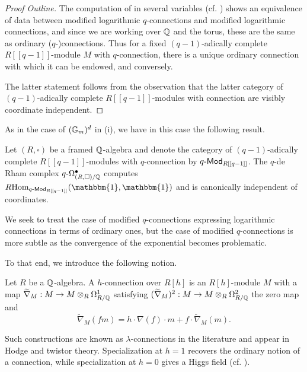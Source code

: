\begin{proof}[Proof Outline]
    The computation of  in several variables (cf. \cite[Lem. 4.1]{qDeformations}) shows an equivalence of data between modified logarithmic $q$-connections and modified logarithmic connections, and since we are working over $\mathbb{Q}$ and the torus, these are the same as ordinary ($q$-)connections. Thus for a fixed $(q-1)$-adically complete $R[[q-1]]$-module $M$ with $q$-connection, there is a unique ordinary connection with which it can be endowed, and conversely.
    
    The latter statement follows from the observation that the latter category of $(q-1)$-adically complete $R[[q-1]]$-modules with connection are visibly coordinate independent. 
\end{proof}
As in the case of $(\mathbb{G}_{m})^{d}$ in  (i), we have in this case the following result. 
\begin{corollary}\label{corr: modules with q-connection are coordinate independent}
    Let $(R,\square)$ be a framed $\mathbb{Q}$-algebra and denote the category of $(q-1)$-adically complete $R[[q-1]]$-modules with $q$-connection by $q\text{-}\mathsf{Mod}_{R[[q-1]]}$. The $q$-de Rham complex $q\text{-}\Omega_{(R,\square)/\mathbb{Q}}^{\bullet}$ computes $R\Hom_{q\dash\Mod_{R[[q-1]]}}(\mathbbm{1},\mathbbm{1})$ and is canonically independent of coordinates. 
\end{corollary}
We seek to treat the case of modified $q$-connections expressing logarithmic connections in terms of ordinary ones, but the case of modified $q$-connections is more subtle as the convergence of the exponential becomes problematic. 

To that end, we introduce the following notion. 
\begin{definition}[$h$-Connections]\label{def: h-connection}
    Let $R$ be a $\mathbb{Q}$-algebra. A $h$-connection over $R[h]$ is an $R[h]$-module $M$ with a map $\widetilde{\nabla}_{M}:M\to M\otimes_{R}\Omega^{1}_{R/\mathbb{Q}}$ satisfying $(\widetilde{\nabla}_{M})^{2}:M\to M\otimes_{R}\Omega^{2}_{R/\mathbb{Q}}$ the zero map and 
    $$\widetilde{\nabla}_{M}(fm)=h\cdot\nabla(f)\cdot m+f\cdot\widetilde{\nabla}_{M}(m).$$
\end{definition}
\begin{remark}
    Such constructions are known as $\lambda$-connections in the literature and appear in Hodge and twistor theory. Specialization at $h=1$ recovers the ordinary notion of a connection, while specialization at $h=0$ gives a Higgs field (cf. \cite[\S 2.3]{MorrowTsuji}). 
\end{remark} 

